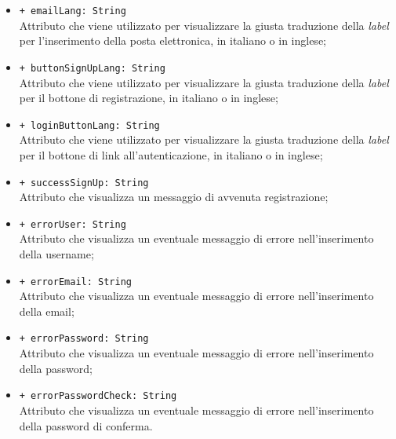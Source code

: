\begin{itemize}
\begin{itemize}
		\item \texttt{+ emailLang: String} \\ Attributo che viene utilizzato per visualizzare la giusta traduzione della \textit{label} per l'inserimento della posta elettronica, in italiano o in inglese;
		\item \texttt{+ buttonSignUpLang: String} \\ Attributo che viene utilizzato per visualizzare la giusta traduzione della \textit{label} per il bottone di registrazione, in italiano o in inglese;
		\item \texttt{+ loginButtonLang: String} \\ Attributo che viene utilizzato per visualizzare la giusta traduzione della \textit{label} per il bottone di link all'autenticazione, in italiano o in inglese;
		\item \texttt{+ successSignUp: String} \\ Attributo che visualizza un messaggio di avvenuta registrazione;
		\item \texttt{+ errorUser: String} \\ Attributo che visualizza un eventuale messaggio di errore nell'inserimento della username;
		\item \texttt{+ errorEmail: String} \\ Attributo che visualizza un eventuale messaggio di errore nell'inserimento della email;
		\item \texttt{+ errorPassword: String} \\ Attributo che visualizza un eventuale messaggio di errore nell'inserimento della password;
		\item \texttt{+ errorPasswordCheck: String} \\ Attributo che visualizza un eventuale messaggio di errore nell'inserimento della password di conferma.
	\end{itemize}
\end{itemize}


